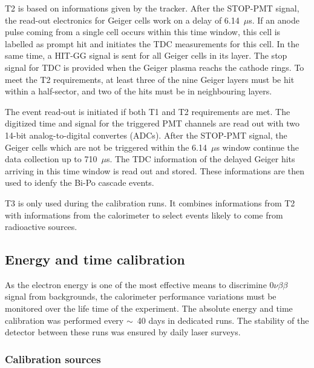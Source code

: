 \documentclass[main.tex]{subfiles}
\begin{document}
\bigskip


\NI T2 is based on informations given by the tracker. After the STOP-PMT signal, the read-out electronics for Geiger cells work on a delay of 6.14~$\mu$s. If an anode pulse coming from a single cell occurs within this time window, this cell is labelled as prompt hit and initiates the TDC measurements for this cell. In the same time, a HIT-GG signal is sent for all Geiger cells in its layer. The stop signal for TDC is provided when the Geiger plasma reachs the cathode rings. To meet the T2 requirements, at least three of the nine Geiger layers must be hit within a half-sector, and two of the hits must be in neighbouring layers.


\bigskip


\NI The event read-out is initiated if both T1 and T2 requirements are met. The digitized time and signal for the triggered PMT channels are read out with two 14-bit analog-to-digital convertes (ADCs). After the STOP-PMT signal, the Geiger cells which are not be triggered within the 6.14~$\mu$s window continue the data collection up to 710~$\mu$s. The TDC information of the delayed Geiger hits arriving in this time window is read out and stored. These informations are then used to idenfy the Bi-Po cascade events.


\bigskip


\NI T3 is only used during the calibration runs. It combines informations from T2 with informations from the calorimeter to select events likely to come from radioactive sources.




\subsection{Energy and time calibration}


\NI As the electron energy is one of the most effective means to discrimine 0$\nu\beta\beta$ signal from backgrounds, the calorimeter performance variations must be monitored over the life time of the experiment. The absolute energy and time calibration was performed every $\sim$~40 days in dedicated runs. The stability of the detector between these runs was ensured by daily laser surveys.
  

\subsubsection{Calibration sources}
\end{document}
